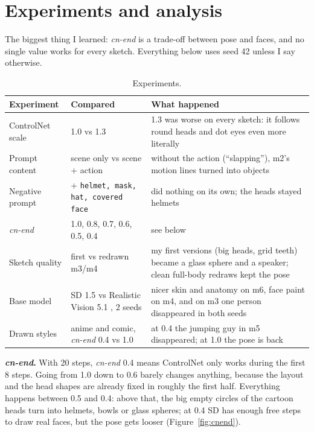 \documentclass[11pt,a4paper]{article}
\newcommand{\cnend}{\textit{cn-end}}
\begin{document}
\section*{Experiments and analysis}

The biggest thing I learned: \cnend{} is a trade-off between pose and faces, and no single value works for
every sketch. Everything below uses seed 42 unless I say otherwise.

\begin{table}[H]
\centering
\caption{Experiments.}
\begin{tabular}{p{2.6cm}p{4.2cm}p{7.9cm}}
\toprule
Experiment & Compared & What happened \\
\midrule
ControlNet scale & 1.0 vs 1.3 & 1.3 was worse on every sketch: it follows round heads and dot eyes even more
  literally \\
Prompt content & scene only vs scene + action & without the action (``slapping''), m2's motion lines turned
  into objects \\
Negative prompt & + \texttt{helmet, mask, hat, covered face} & did nothing on its own; the heads stayed
  helmets \\
\cnend & 1.0, 0.8, 0.7, 0.6, 0.5, 0.4 & see below \\
Sketch quality & first vs redrawn m3/m4 & my first versions (big heads, grid teeth) became a glass sphere and
  a speaker; clean full-body redraws kept the pose \\
Base model & SD 1.5 vs Realistic Vision 5.1 \cite{realisticvision}, 2 seeds & nicer skin and anatomy on m6,
  face paint on m4, and on m3 one person disappeared in both seeds \\
Drawn styles & anime and comic, \cnend{} 0.4 vs 1.0 & at 0.4 the jumping guy in m5 disappeared; at 1.0 the
  pose is back \\
\bottomrule
\end{tabular}
\end{table}

\textbf{\cnend.} With 20 steps, \cnend{} 0.4 means ControlNet only works during the first 8 steps. Going from
1.0 down to 0.6 barely changes anything, because the layout and the head shapes are already fixed in roughly
the first half. Everything happens between 0.5 and 0.4: above that, the big empty circles of the cartoon heads
turn into helmets, bowls or glass spheres; at 0.4 SD has enough free steps to draw real faces, but the pose
gets looser (Figure~\ref{fig:cnend}).
\end{document}
